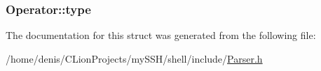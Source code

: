 \subsubsection[{\texorpdfstring{type}{type}}]{ Operator\+::type}\hypertarget{structOperator_a784d9909ad51fd9379c819ea78801c50}{}\label{structOperator_a784d9909ad51fd9379c819ea78801c50}


The documentation for this struct was generated from the following file\+:\begin{DoxyCompactItemize}
\item 
/home/denis/\+C\+Lion\+Projects/my\+S\+S\+H/shell/include/\hyperlink{Parser_8h}{Parser.\+h}\end{DoxyCompactItemize}
